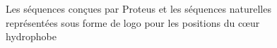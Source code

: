    \begin{figure}[t]
     \caption{Les séquences conçues par Proteus et les séquences naturelles représentées sous forme de logo pour les positions du cœur hydrophobe}
\label{logo:corePDZ}
   \end{figure}


